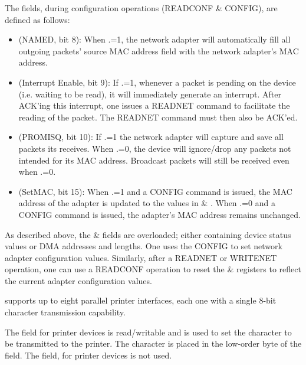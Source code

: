 


The  fields, during configuration operations (READCONF \& CONFIG), are defined as follows:
\begin{itemize}
	\item {} (NAMED, bit 8): When .=1, the network adapter will automatically fill all outgoing packets’ source MAC address field with the network adapter’s MAC address.
	\item {} (Interrupt Enable, bit 9): If .=1, whenever a packet is pending on the device (i.e. waiting to be read), it will immediately generate an interrupt. 
		After ACK’ing this interrupt, one issues a READNET command to facilitate the reading of the packet. 
		The READNET command must then also be ACK’ed.
	\item {} (PROMISQ, bit 10): If .=1 the network adapter will capture and save all packets its receives. 
		When .=0, the device will ignore/drop any packets not intended for its MAC address. 
		Broadcast packets will still be received even when .=0.
	\item {} (SetMAC, bit 15): When .=1 and a CONFIG command is issued, the MAC address of the adapter is updated to the values in  \& . When .=0 and a CONFIG command is issued, the adapter’s MAC address remains unchanged.
\end{itemize}

As described above, the  \&  fields are overloaded; either containing device status values or DMA addresses and lengths. 
One uses the CONFIG to set network adapter configuration values. 
Similarly, after a READNET or WRITENET operation, one can use a READCONF operation to reset the  \&  registers to reflect the current adapter configuration values.



\uarm{} supports up to eight parallel printer interfaces, each one with a single 8-bit character transmission capability.

The  field for printer devices is read/writable and is used to set the character to be transmitted to the printer. 
The character is placed in the low-order byte of the  field. 
The  field, for printer devices is not used.

